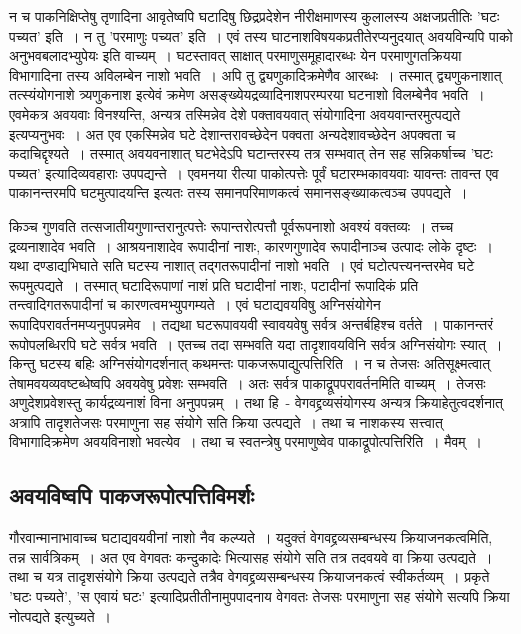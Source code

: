 		न च पाकनिक्षिप्तेषु तृणादिना आवृतेष्वपि घटादिषु छिद्रप्रदेशेन नीरीक्षमाणस्य कुलालस्य अक्षजप्रतीतिः 'घटः पच्यत' इति~। न तु 'परमाणुः पच्यत' इति~। एवं तस्य घाटनाशविषयकप्रतीतेरप्यनुदयात् अवयविन्यपि पाको अनुभवबलादभ्युपेयः इति वाच्यम्~। घटस्तावत् साक्षात् परमाणुसमूहादारब्धः येन परमाणुगतक्रियया विभागादिना तस्य अविलम्बेन नाशो भवति~। अपि तु द्व्यणुकादिक्रमेणैव आरब्धः~। तस्मात् द्व्यणुकनाशात् तत्स्यंयोगनाशे त्र्यणुकनाश इत्येवं क्रमेण असङ्ख्येयद्रव्यादिनाशपरम्परया घटनाशो विलम्बेनैव भवति~। एवमेकत्र अवयवाः विनश्यन्ति, अन्यत्र तस्मिन्नेव देशे पक्तावयवात् संयोगादिना अवयवान्तरमुत्पद्यते इत्यप्यनुभवः~। अत एव एकस्मिन्नेव घटे देशान्तरावच्छेदेन पक्वता अन्यदेशावच्छेदेन अपक्वता च कदाचिद्दृश्यते~। तस्मात् अवयवनाशात् घटभेदेऽपि घटान्तरस्य तत्र सम्भवात् तेन सह सन्निकर्षाच्च 'घटः पच्यत' इत्यादिव्यवहाराः उपपद्यन्ते~। एवमनया रीत्या पाकोत्पत्तेः पूर्वं घटारम्भकावयवाः यावन्तः तावन्त एव पाकानन्तरमपि घटमुत्पादयन्ति इत्यतः तस्य समानपरिमाणकत्वं समानसङ्ख्याकत्वञ्च उपपद्यते~।

		किञ्च गुणवति तत्सजातीयगुणान्तरानुत्पत्तेः रूपान्तरोत्पत्तौ पूर्वरूपनाशो अवश्यं वक्तव्यः~। तच्च द्रव्यनाशादेव भवति~। आश्रयनाशादेव रूपादीनां नाशः, कारणगुणादेव रूपादीनाञ्च उत्पादः लोके दृष्टः~। यथा दण्डाद्यभिघाते सति घटस्य नाशात् तद्गतरूपादीनां नाशो भवति~। एवं घटोत्पत्त्यनन्तरमेव घटे रूपमुत्पद्यते~। तस्मात् घटादिरूपाणां नाशं प्रति घटादीनां नाशः, पटादीनां रूपादिकं प्रति तन्त्वादिगतरूपादीनां च कारणत्वमभ्युपगम्यते~। एवं घटाद्यवयविषु अग्निसंयोगेन रूपादिपरावर्तनमप्यनुपपन्नमेव~। तद्यथा घटरूपावयवी स्वावयवेषु सर्वत्र अन्तर्बहिश्च वर्तते~। पाकानन्तरं रूपोपलब्धिरपि घटे सर्वत्र भवति~। एतच्च तदा सम्भवति यदा तादृशावयविनि सर्वत्र अग्निसंयोगः स्यात्~। किन्तु घटस्य बहिः अग्निसंयोगदर्शनात् कथमन्तः पाकजरूपाद्युत्पत्तिरिति~। न च तेजसः अतिसूक्ष्मत्वात् तेषामवयव्यवष्टब्धेष्वपि अवयवेषु प्रवेशः सम्भवति~। अतः सर्वत्र पाकाद्रूपपरावर्तनमिति वाच्यम्~। तेजसः अणुदेशप्रवेशस्तु कार्यद्रव्यनाशं विना अनुपपन्नम्~। तथा हि~- वेगवद्द्रव्यसंयोगस्य अन्यत्र क्रियाहेतुत्वदर्शनात् अत्रापि तादृशतेजसः परमाणुना सह संयोगे सति क्रिया उत्पद्यते~। तथा च नाशकस्य सत्त्वात् विभागादिक्रमेण अवयविनाशो भवत्येव~। तथा च स्वतन्त्रेषु परमाणुष्वेव पाकाद्रूपोत्पत्तिरिति~। मैवम्~।

		\subsection{अवयविष्वपि पाकजरूपोत्पत्तिविमर्शः}

		गौरवान्मानाभावाच्च घटाद्यवयवीनां नाशो नैव कल्प्यते~। यदुक्तं वेगवद्द्रव्यसम्बन्धस्य क्रियाजनकत्वमिति, तन्न सार्वत्रिकम्~। अत एव वेगवतः कन्दुकादेः भित्यासह संयोगे सति तत्र तदवयवे वा क्रिया उत्पद्यते~। तथा च यत्र तादृशसंयोगे क्रिया उत्पद्यते तत्रैव  वेगवद्द्रव्यसम्बन्धस्य क्रियाजनकत्वं स्वीकर्तव्यम्~। प्रकृते 'घटः पच्यते', 'स एवायं घटः' इत्यादिप्रतीतीनामुपपादनाय वेगवतः तेजसः परमाणुना सह संयोगे सत्यपि क्रिया नोत्पद्यते इत्युच्यते~। 

